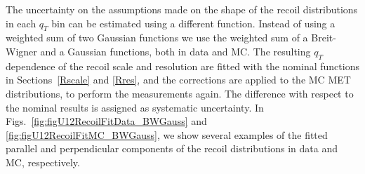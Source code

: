 \clearpage
The uncertainty on the assumptions made on the shape of the recoil distributions in each $q_{T}$ bin can be estimated using a different function. Instead of using a weighted sum of two Gaussian functions we use the weighted sum of a Breit-Wigner and a Gaussian functions, both in data and MC. The resulting $q_{T}$ dependence of the recoil scale and resolution are fitted with the nominal functions in Sections~\ref{Rscale} and \ref{Rres}, and the corrections are applied to the MC MET distributions, to perform the measurements again. The difference with respect to the nominal results is assigned as systematic uncertainty.  In Figs.~\ref{fig:figU12RecoilFitData_BWGauss} and \ref{fig:figU12RecoilFitMC_BWGauss}, we show several examples of the fitted parallel and perpendicular components of the recoil distributions in data and MC, respectively.

